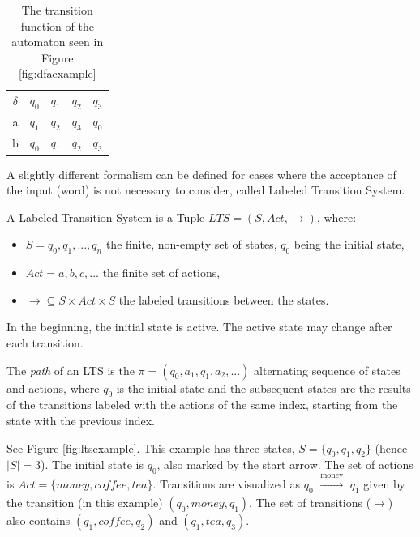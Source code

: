 \begin{table}[!ht]
	\centering
	\begin{tabular}{|c|cccc|}
		\hline
		$\delta$ & $q_0$ & $q_1$ & $q_2$ & $q_3$\\ \cline{1-5}
		a & $q_1$ & $q_2$ & $q_3$ & $q_0$ \\	
		b & $q_0$ & $q_1$ & $q_2$ & $q_3$ \\	\hline
	\end{tabular}
	\caption{The transition function of the automaton seen in Figure \ref{fig:dfaexample}}
	\label{tab:dfaexampledelta}
\end{table}

A slightly different formalism can be defined for cases where the acceptance of the input (word) is not necessary to consider, called Labeled Transition System.

\begin{definition}
	A Labeled Transition System is a Tuple $LTS=(S, Act, \rightarrow)$, where:
	\begin{itemize}
		\item $S={q_0, q_1, ..., q_n}$ the finite, non-empty set of states, $q_0$ being the initial state,
		\item $Act = {a, b, c, ...}$ the finite set of actions,
		\item $\rightarrow \subseteq S \times Act \times S$ the labeled transitions between the states.
	\end{itemize}
	In the beginning, the initial state is active. The active state may change after each transition.
	
	The \textit{path} of an LTS is the $\pi = (q_0, a_1, q_1, a_2, ...)$ alternating sequence of states and actions, where $q_0$ is the initial state and the subsequent states are the results of the transitions labeled with the actions of the same index, starting from the state with the previous index. 
\end{definition}

\begin{example}
	\label{ex:ltsexample}
	See Figure \ref{fig:ltsexample}. This example has three states, $S = \{q_0, q_1, q_2\}$ (hence $|S| = 3$). The initial state is $q_0$, also marked by the start arrow. The set of actions is $Act = \{money, coffee, tea\}$. Transitions are visualized as $q_0$ $\xrightarrow[]{\text{money}}$ $q_1$ given by the transition (in this example) $(q_0, money, q_1)$. The set of transitions ($\rightarrow$) also contains $(q_1, coffee, q_2)$ and $(q_1, tea, q_3)$.
\end{example}

